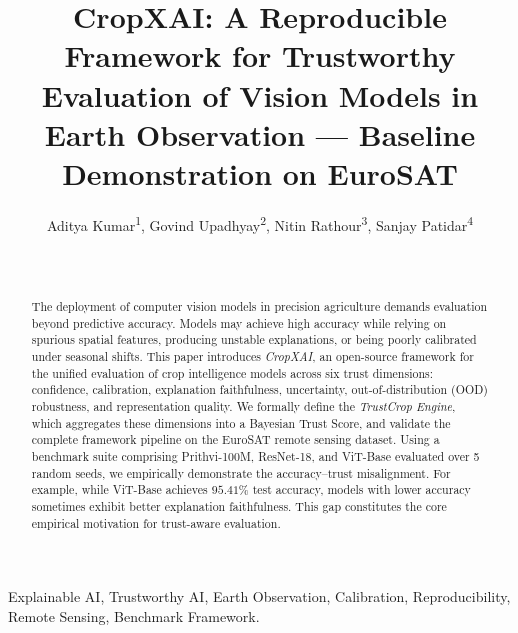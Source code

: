 \documentclass[10pt,journal]{IEEEtran}
\begin{document}
\title{CropXAI: A Reproducible Framework for Trustworthy Evaluation of Vision Models in Earth Observation --- Baseline Demonstration on EuroSAT}

\author{Aditya Kumar\textsuperscript{1}, Govind Upadhyay\textsuperscript{2}, Nitin Rathour\textsuperscript{3}, Sanjay Patidar\textsuperscript{4} \\
 \\
\\
}

\maketitle

\begin{abstract}
The deployment of computer vision models in precision agriculture demands
evaluation beyond predictive accuracy. Models may achieve high accuracy while
relying on spurious spatial features, producing unstable explanations, or
being poorly calibrated under seasonal shifts. This paper introduces
\textit{CropXAI}, an open-source framework for the unified evaluation of
crop intelligence models across six trust dimensions: confidence, calibration,
explanation faithfulness, uncertainty, out-of-distribution (OOD) robustness,
and representation quality. We formally define the \textit{TrustCrop Engine},
which aggregates these dimensions into a Bayesian Trust Score, and validate
the complete framework pipeline on the EuroSAT remote sensing dataset.
Using a benchmark suite comprising Prithvi-100M, ResNet-18, and ViT-Base evaluated over 5 random seeds, we empirically demonstrate the accuracy--trust misalignment. For example, while ViT-Base achieves $95.41\%$ test accuracy, models with lower accuracy sometimes exhibit better explanation faithfulness. This gap constitutes the core empirical motivation for trust-aware evaluation.
\end{abstract}

\begin{IEEEkeywords} 
Explainable AI, Trustworthy AI, Earth Observation, Calibration, Reproducibility, Remote Sensing, Benchmark Framework.
\end{IEEEkeywords}
\end{document}
